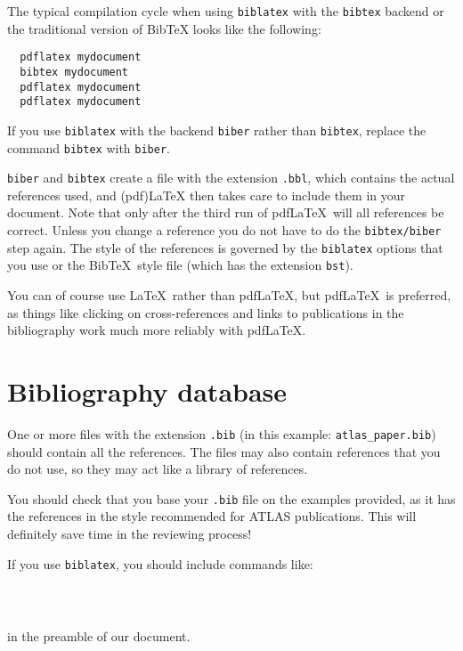 \documentclass[UKenglish,texlive=2013]{latex/atlasdoc}
\newcommand*{\BibTeX}{Bib\TeX}
\newcommand{\File}[1]{\texttt{#1}\xspace}
\newcommand{\Package}[1]{\texttt{#1}\xspace}
\begin{document}
The typical compilation cycle when using \Package{biblatex} with the \texttt{bibtex} backend 
or the traditional version of \BibTeX{} looks like the following:
%
\begin{verbatim}
  pdflatex mydocument
  bibtex mydocument
  pdflatex mydocument
  pdflatex mydocument
\end{verbatim}
If you use \Package{biblatex} with the backend \Package{biber} rather than \Package{bibtex}, replace the command
\texttt{bibtex} with \texttt{biber}.

\texttt{biber} and \texttt{bibtex} create a file with the extension \texttt{.bbl}, which
contains the actual references used, and (pdf)\LaTeX{} then takes care to include them in your document. 
Note that only after the third run of pdf\LaTeX\ will all references be correct. 
Unless you change a reference you do not have to do the \texttt{bibtex/biber} step again.
The style of the references is governed by the \Package{biblatex} options that you
use or the \BibTeX\ style file (which has the extension \File{bst}).

You can of course use \LaTeX\ rather than pdf\LaTeX, but pdf\LaTeX\ is preferred,
as things like clicking on cross-references and links to publications in the bibliography
work much more reliably with pdf\LaTeX.


\section{Bibliography database}

One or more files with the extension \texttt{.bib} 
(in this example: \texttt{atlas\_paper.bib}) should contain all the references. 
The files may also contain references that you do not use, so they may act like a
library of references. 

You should check that you base your \File{.bib} file on the examples provided,
as it has the references in the style recommended for ATLAS publications.
This will definitely save time in the reviewing process!

If you use \Package{biblatex}, you should include commands like:
%
\begin{verbatim}
  
  
\end{verbatim}
%
in the preamble of our document.
\end{document}
